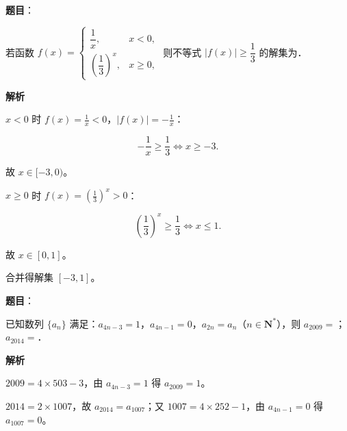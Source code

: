 \begin{answer}

\textbf{题目}：

若函数 $f(x)=\begin{cases}\dfrac1x,&x<0,\\[4pt] \left(\dfrac13\right)^x,&x\geqslant0,\end{cases}$ 则不等式 $|f(x)|\geqslant\dfrac13$ 的解集为\gkblank{}．

\textbf{解析}

$x<0$ 时 $f(x)=\frac1x<0$，$|f(x)|=-\frac1x$：

\nopagebreak[4]
\[-\frac1x\geqslant\frac13\iff x\geqslant-3 .\]

故 $x\in[-3,0)$。

$x\geqslant0$ 时 $f(x)=\left(\frac13\right)^x>0$：

\nopagebreak[4]
\[\left(\frac13\right)^x\geqslant\frac13\iff x\leqslant1 .\]

故 $x\in[0,1]$。

合并得解集 $[-3,1]$。


\end{answer}
\begin{answer}

\textbf{题目}：

已知数列 $\{a_n\}$ 满足：$a_{4n-3}=1$，$a_{4n-1}=0$，$a_{2n}=a_n$（$n\in\mathbf N^*$），则 $a_{2009}=$\gkblank{}；$a_{2014}=$\gkblank{}．

\textbf{解析}

$2009=4\times503-3$，由 $a_{4n-3}=1$ 得 $a_{2009}=1$。

$2014=2\times1007$，故 $a_{2014}=a_{1007}$；又 $1007=4\times252-1$，由 $a_{4n-1}=0$ 得 $a_{1007}=0$。


\end{answer}
